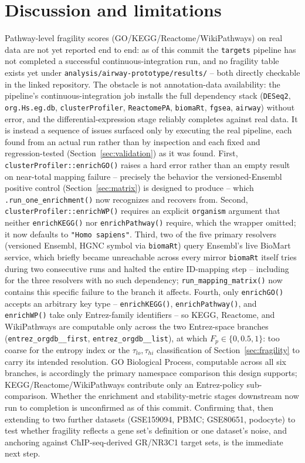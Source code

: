 \documentclass[webpdf,contemporary,large]{oup-authoring-template}
\theoremstyle{thmstyleone}%
\theoremstyle{thmstyletwo}%
\theoremstyle{thmstylethree}%
\begin{document}
\section{Discussion and limitations}\label{sec:limitations}

Pathway-level fragility scores (GO/KEGG/Reactome/WikiPathways) on real data are not yet reported end to end: as of this commit the \texttt{targets} pipeline has not completed a successful continuous-integration run, and no fragility table exists yet under \texttt{analysis/airway-prototype/results/} -- both directly checkable in the linked repository. The obstacle is not annotation-data availability: the pipeline's continuous-integration job installs the full dependency stack (\texttt{DESeq2}, \texttt{org.Hs.eg.db}, \texttt{clusterProfiler}, \texttt{ReactomePA}, \texttt{biomaRt}, \texttt{fgsea}, \texttt{airway}) without error, and the differential-expression stage reliably completes against real data. It is instead a sequence of issues surfaced only by executing the real pipeline, each found from an actual run rather than by inspection and each fixed and regression-tested (Section~\ref{sec:validation}) as it was found. First, \texttt{clusterProfiler::enrichGO()} raises a hard error rather than an empty result on near-total mapping failure -- precisely the behavior the versioned-Ensembl positive control (Section~\ref{sec:matrix}) is designed to produce -- which \texttt{.run\_one\_enrichment()} now recognizes and recovers from. Second, \texttt{clusterProfiler::enrichWP()} requires an explicit \texttt{organism} argument that neither \texttt{enrichKEGG()} nor \texttt{enrichPathway()} require, which the wrapper omitted; it now defaults to \texttt{"Homo sapiens"}. Third, two of the five primary resolvers (versioned Ensembl, HGNC symbol via \texttt{biomaRt}) query Ensembl's live BioMart service, which briefly became unreachable across every mirror \texttt{biomaRt} itself tries during two consecutive runs and halted the entire ID-mapping step -- including for the three resolvers with no such dependency; \texttt{run\_mapping\_matrix()} now contains this specific failure to the branch it affects. Fourth, only \texttt{enrichGO()} accepts an arbitrary key type -- \texttt{enrichKEGG()}, \texttt{enrichPathway()}, and \texttt{enrichWP()} take only Entrez-family identifiers -- so KEGG, Reactome, and WikiPathways are computable only across the two Entrez-space branches (\texttt{entrez\_orgdb\_\_first}, \texttt{entrez\_orgdb\_\_list}), at which $F_p\in\{0,0.5,1\}$: too coarse for the entropy index or the $\tau_{lo},\tau_{hi}$ classification of Section~\ref{sec:fragility} to carry its intended resolution. GO Biological Process, computable across all six branches, is accordingly the primary namespace comparison this design supports; KEGG/Reactome/WikiPathways contribute only an Entrez-policy sub-comparison. Whether the enrichment and stability-metric stages downstream now run to completion is unconfirmed as of this commit. Confirming that, then extending to two further datasets (GSE159094, PBMC; GSE80651, podocyte) to test whether fragility reflects a gene set's definition or one dataset's noise, and anchoring against ChIP-seq-derived GR/NR3C1 target sets, is the immediate next step.
\end{document}
